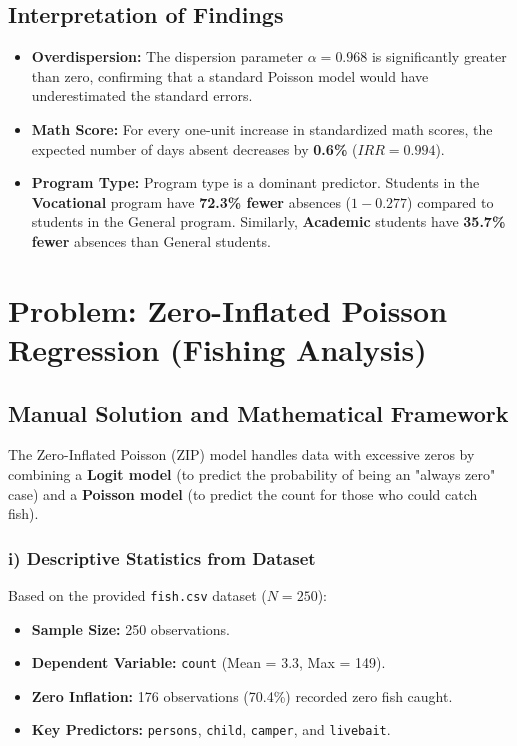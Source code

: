 \documentclass[12pt]{article}
\begin{document}
\subsection{Interpretation of Findings}
\begin{itemize}
    \item \textbf{Overdispersion:} The dispersion parameter $\alpha = 0.968$ is significantly greater than zero, confirming that a standard Poisson model would have underestimated the standard errors.
    \item \textbf{Math Score:} For every one-unit increase in standardized math scores, the expected number of days absent decreases by \textbf{0.6\%} ($IRR=0.994$).
    \item \textbf{Program Type:} Program type is a dominant predictor. Students in the \textbf{Vocational} program have \textbf{72.3\% fewer} absences ($1 - 0.277$) compared to students in the General program. Similarly, \textbf{Academic} students have \textbf{35.7\% fewer} absences than General students.
\end{itemize}

\newpage
\section{Problem: Zero-Inflated Poisson Regression (Fishing Analysis)}
\label{prob_zip_final}

\subsection{Manual Solution and Mathematical Framework}
The Zero-Inflated Poisson (ZIP) model handles data with excessive zeros by combining a \textbf{Logit model} (to predict the probability of being an "always zero" case) and a \textbf{Poisson model} (to predict the count for those who could catch fish).

\subsubsection{i) Descriptive Statistics from Dataset}
Based on the provided \texttt{fish.csv} dataset ($N=250$):
\begin{itemize}
    \item \textbf{Sample Size:} 250 observations.
    \item \textbf{Dependent Variable:} \texttt{count} (Mean = 3.3, Max = 149).
    \item \textbf{Zero Inflation:} 176 observations (70.4\%) recorded zero fish caught.
    \item \textbf{Key Predictors:} \texttt{persons}, \texttt{child}, \texttt{camper}, and \texttt{livebait}.
\end{itemize}
\end{document}
